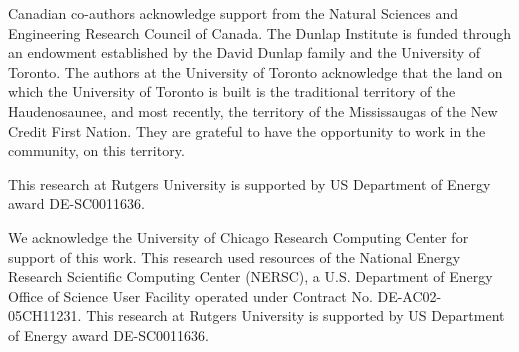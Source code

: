 \documentclass[\docopts]{\docclass}
\begin{document}
Canadian co-authors acknowledge support from the Natural Sciences and Engineering Research Council of Canada.
The Dunlap Institute is funded through an endowment established by the David Dunlap family and the University of Toronto.
The authors at the University of Toronto acknowledge that the land on which the University of Toronto is built is the traditional territory of the Haudenosaunee, and most recently, the territory of the Mississaugas of the New Credit First Nation.
They are grateful to have the opportunity to work in the community, on this territory.

This research at Rutgers University is supported by US Department of Energy award DE-SC0011636.

We acknowledge the University of Chicago Research Computing Center for support of this work.
This research used resources of the National Energy Research Scientific Computing Center (NERSC), a U.S. Department of Energy Office of Science User Facility operated under Contract No. DE-AC02-05CH11231.
This research at Rutgers University is supported by US Department of Energy award DE-SC0011636.



%
%




\end{document}
